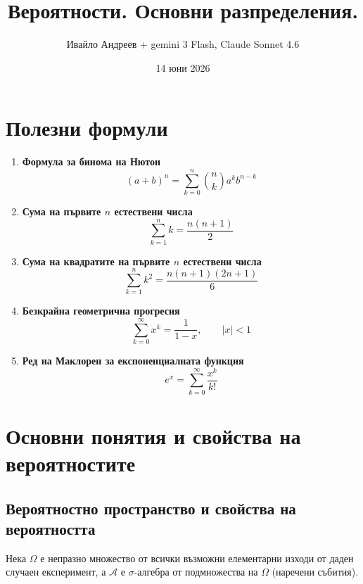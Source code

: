 \documentclass{scrartcl}
\title{Вероятности. Основни разпределения.}
\author{Ивайло Андреев + gemini 3 Flash, Claude Sonnet 4.6}
\date{14 юни 2026}
\begin{document}
\maketitle

\tableofcontents

\newpage

\begin{FlushLeft}

\section*{Полезни формули}

\begin{enumerate}

\item \textbf{Формула за бинома на Нютон}
\[
(a+b)^n
=
\sum_{k=0}^{n}
\binom{n}{k}
a^k b^{n-k}
\]

\item \textbf{Сума на първите $n$ естествени числа}
\[
\sum_{k=1}^{n} k
=
\frac{n(n+1)}{2}
\]

\item \textbf{Сума на квадратите на първите $n$ естествени числа}
\[
\sum_{k=1}^{n} k^2
=
\frac{n(n+1)(2n+1)}{6}
\]

\item \textbf{Безкрайна геометрична прогресия}
\[
\sum_{k=0}^{\infty} x^k
=
\frac{1}{1-x},
\qquad |x|<1
\]

\item \textbf{Ред на Маклорен за експоненциалната функция}
\[
e^x
=
\sum_{k=0}^{\infty}
\frac{x^k}{k!}
\]

\end{enumerate}

\section{Основни понятия и свойства на вероятностите}

\subsection{Вероятностно пространство и свойства на вероятността}
Нека $\Omega$ е непразно множество от всички възможни елементарни изходи от даден случаен експеримент, а $\mathcal{A}$ е $\sigma$-алгебра от подмножества на $\Omega$ (наречени събития). 


\end{FlushLeft}
\end{document}
